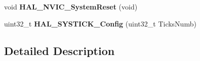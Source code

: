 \begin{DoxyCompactItemize}
\item 
void {\bfseries H\+A\+L\+\_\+\+N\+V\+I\+C\+\_\+\+System\+Reset} (void)\hypertarget{group___c_o_r_t_e_x___exported___functions___group1_gac83d89028fabdf5d4c38ecf4fbfbefdc}{}\label{group___c_o_r_t_e_x___exported___functions___group1_gac83d89028fabdf5d4c38ecf4fbfbefdc}

\item 
uint32\+\_\+t {\bfseries H\+A\+L\+\_\+\+S\+Y\+S\+T\+I\+C\+K\+\_\+\+Config} (uint32\+\_\+t Ticks\+Numb)\hypertarget{group___c_o_r_t_e_x___exported___functions___group1_gac3a3f0d53c315523a8e6e7bcac1940cf}{}\label{group___c_o_r_t_e_x___exported___functions___group1_gac3a3f0d53c315523a8e6e7bcac1940cf}

\end{DoxyCompactItemize}


\subsection{Detailed Description}
